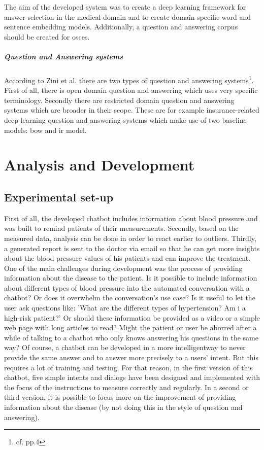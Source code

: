 The aim of the developed system was to create a deep learning framework for answer selection in the medical domain and to create domain-specific word and sentence embedding models. Additionally, a question and answering corpus should be created for \ac{osce}s.

\paragraph{Question and Answering systems}
According to Zini et al. there are two types of question and answering systems\footnote{cf.\autocite{zini} pp.4}. First of all, there is open domain question and answering which uses very specific terminology. Secondly there are restricted domain question and answering systems which are broader in their scope. These are for example insurance-related deep learning question and answering systems which make use of two baseline models: \ac{bow} and \ac{ir} model. 

\chapter{Analysis and Development}

\section{Experimental set-up} \label{first_ideas}

First of all, the developed chatbot includes information about blood pressure and was built to remind patients of their measurements. Secondly, based on the measured data, analysis can be done in order to react earlier to outliers. Thirdly, a generated report is sent to the doctor via email so that he can get more insights about the blood pressure values of his patients and can improve the treatment.
One of the main challenges during development was the process of providing information about the disease to the patient. Is it possible to include information about different types of blood pressure into the automated conversation with a chatbot? Or does it overwhelm the conversation's use case? Is it useful to let the user ask questions like: 'What are the different types of hypertension? Am i a high-risk patient?' 
Or should these information be provided as a video or a simple web page with long articles to read? Might the patient or user be aborred after a while of talking to a chatbot who only knows answering his questions in the same way?
Of course, a chatbot can be developed in a more intelligentway to never provide the same answer and to answer more precisely to a users' intent. But this requires a lot of training and testing. 
For that reason, in the first version of this chatbot, five simple intents and dialogs have been designed and implemented with the focus of the instructions to measure correctly and regularly. 
In a second or third version, it is possible to focus more on the improvement of providing information about the disease (by not doing this in the style of question and answering).

